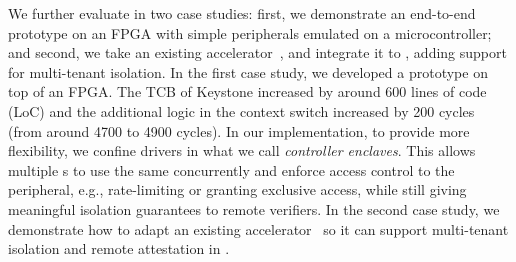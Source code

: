 
We further evaluate \name in two case studies: first, we demonstrate an end-to-end prototype on an FPGA with simple peripherals emulated on a microcontroller; and second, we take an existing accelerator~\cite{zaruba2020manticore}, and integrate it to \name{}, adding support for multi-tenant isolation. In the first case study, we developed a prototype on top of an FPGA. The TCB of Keystone increased by around $600$ lines of code (LoC) and the additional logic in the context switch increased by 200 cycles (from around 4700 to 4900 cycles).
In our implementation, to provide more flexibility, we confine drivers in what we call \emph{controller enclaves}. This allows multiple \nameenclave{}s to use the same \sphw concurrently and enforce access control to the peripheral, e.g., rate-limiting or granting exclusive access, while still giving meaningful isolation guarantees to remote verifiers. In the second case study, we demonstrate how to adapt an existing accelerator~\cite{zaruba2020manticore} so it can support multi-tenant isolation and remote attestation in \name{}.


